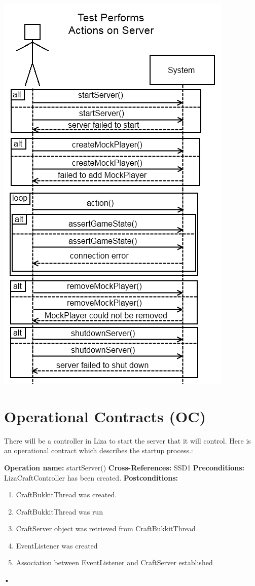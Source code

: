 \documentclass{article}
\begin{document}
\includegraphics{ssd}

\section{Operational Contracts (OC)}

There will be a controller in Liza to start the server that it will control.
 Here is an operational contract which describes the startup process.:  \newline

\textbf{Operation name:} startServer() 
\newline \indent
\textbf{Cross-References:} SSD1 
\newline  \indent
\textbf{Preconditions:} LizaCraftController has been created.
\newline  \indent
\textbf{Postconditions: }
	\begin{enumerate}
		\item CraftBukkitThread was created.
		\item CraftBukkitThread was run
		\item CraftServer object was retrieved from CraftBukkitThread
		\item EventListener was created
		\item Association between EventListener and CraftServer established
	\end{enumerate}•
\end{document}
